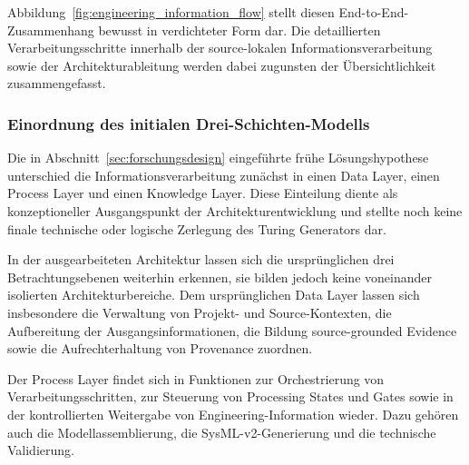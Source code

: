 %
%
%

Abbildung~\ref{fig:engineering_information_flow} stellt diesen
End-to-End-Zusammenhang bewusst in verdichteter Form dar. Die detaillierten
Verarbeitungsschritte innerhalb der source-lokalen Informationsverarbeitung
sowie der Architekturableitung werden dabei zugunsten der Übersichtlichkeit
zusammengefasst.

\subsubsection{Einordnung des initialen Drei-Schichten-Modells}
\label{sec:three_layer_final_mapping}

Die in Abschnitt~\ref{sec:forschungsdesign} eingeführte frühe
Lösungshypothese unterschied die Informationsverarbeitung zunächst in einen
Data Layer, einen Process Layer und einen Knowledge Layer. Diese Einteilung
diente als konzeptioneller Ausgangspunkt der Architekturentwicklung und stellte
noch keine finale technische oder logische Zerlegung des Turing Generators dar.

In der ausgearbeiteten Architektur lassen sich die ursprünglichen drei
Betrachtungsebenen weiterhin erkennen, sie bilden jedoch keine voneinander
isolierten Architekturbereiche. Dem ursprünglichen Data Layer lassen sich
insbesondere die Verwaltung von Projekt- und Source-Kontexten, die Aufbereitung
der Ausgangsinformationen, die Bildung source-grounded Evidence sowie die
Aufrechterhaltung von Provenance zuordnen.

Der Process Layer findet sich in Funktionen zur Orchestrierung von
Verarbeitungsschritten, zur Steuerung von Processing States und Gates sowie in
der kontrollierten Weitergabe von Engineering-Information wieder. Dazu gehören
auch die Modellassemblierung, die SysML-v2-Generierung und die technische
Validierung.

